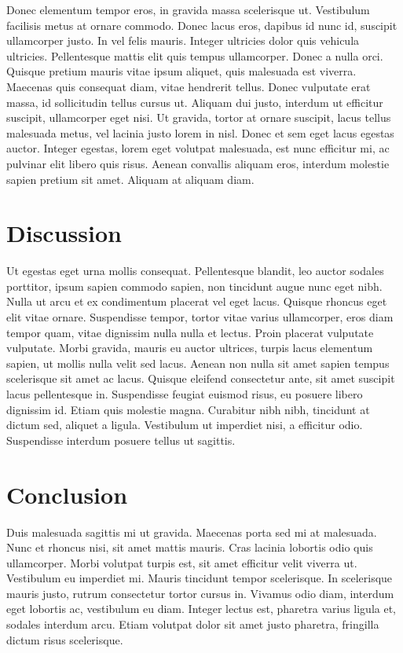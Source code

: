 \documentclass[a4paper, 10pt]{article}
\begin{document}
\begin{multicols}{2}

Donec elementum tempor eros, in gravida massa scelerisque ut. Vestibulum facilisis metus at ornare commodo. Donec lacus eros, dapibus id nunc id, suscipit ullamcorper justo. In vel felis mauris. Integer ultricies dolor quis vehicula ultricies. Pellentesque mattis elit quis tempus ullamcorper. Donec a nulla orci. Quisque pretium mauris vitae ipsum aliquet, quis malesuada est viverra. Maecenas quis consequat diam, vitae hendrerit tellus. Donec vulputate erat massa, id sollicitudin tellus cursus ut. Aliquam dui justo, interdum ut efficitur suscipit, ullamcorper eget nisi. Ut gravida, tortor at ornare suscipit, lacus tellus malesuada metus, vel lacinia justo lorem in nisl. Donec et sem eget lacus egestas auctor. Integer egestas, lorem eget volutpat malesuada, est nunc efficitur mi, ac pulvinar elit libero quis risus. Aenean convallis aliquam eros, interdum molestie sapien pretium sit amet. Aliquam at aliquam diam.



\section{Discussion}
Ut egestas eget urna mollis consequat. Pellentesque blandit, leo auctor sodales porttitor, ipsum sapien commodo sapien, non tincidunt augue nunc eget nibh. Nulla ut arcu et ex condimentum placerat vel eget lacus. Quisque rhoncus eget elit vitae ornare. Suspendisse tempor, tortor vitae varius ullamcorper, eros diam tempor quam, vitae dignissim nulla nulla et lectus. Proin placerat vulputate vulputate. Morbi gravida, mauris eu auctor ultrices, turpis lacus elementum sapien, ut mollis nulla velit sed lacus. Aenean non nulla sit amet sapien tempus scelerisque sit amet ac lacus. Quisque eleifend consectetur ante, sit amet suscipit lacus pellentesque in. Suspendisse feugiat euismod risus, eu posuere libero dignissim id. Etiam quis molestie magna. Curabitur nibh nibh, tincidunt at dictum sed, aliquet a ligula. Vestibulum ut imperdiet nisi, a efficitur odio. Suspendisse interdum posuere tellus ut sagittis.

\section{Conclusion}
Duis malesuada sagittis mi ut gravida. Maecenas porta sed mi at malesuada. Nunc et rhoncus nisi, sit amet mattis mauris. Cras lacinia lobortis odio quis ullamcorper. Morbi volutpat turpis est, sit amet efficitur velit viverra ut. Vestibulum eu imperdiet mi. Mauris tincidunt tempor scelerisque. In scelerisque mauris justo, rutrum consectetur tortor cursus in. Vivamus odio diam, interdum eget lobortis ac, vestibulum eu diam. Integer lectus est, pharetra varius ligula et, sodales interdum arcu. Etiam volutpat dolor sit amet justo pharetra, fringilla dictum risus scelerisque.
\end{multicols}
\end{document}
